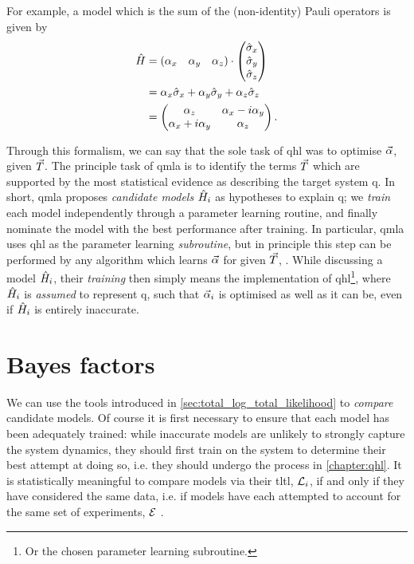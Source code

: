 For example, a model which is the sum of the (non-identity) Pauli operators is given by
\begin{align}
    \label{eqn:pauli_sum_model}
    \begin{split}
        \hat{H} &= \begin{matrix}(\alpha_x & \alpha_y & \alpha_z)\end{matrix} \cdot \left(\begin{matrix}\hat{\sigma}_{x} \\ \hat{\sigma}_{y} \\ \hat{\sigma}_{z}\end{matrix}\right) \\
        &= \alpha_x \hat{\sigma}_{x} + \alpha_y \hat{\sigma}_{y} + \alpha_z \hat{\sigma}_{z} \\
        &= \begin{pmatrix}
            \alpha_z & \alpha_x - i \alpha_y \\
            \alpha_x + i\alpha_y & \alpha_z
        \end{pmatrix}.
    \end{split}
\end{align}
\par 

Through this formalism, we can say that the sole task of \gls{qhl} was to optimise $\vec{\alpha}$, given ${ \vec{T} }$. 
The principle task of \gls{qmla} is to identify the terms ${ \vec{T} }$ 
    which are supported by the most statistical evidence as describing the target system \gls{q}. 
In short, \gls{qmla} proposes \emph{candidate models} $\hat{H}_i$ as hypotheses to explain \gls{q}; 
    we \emph{train} each model independently through a parameter learning routine, 
    and finally nominate the model with the best performance after training. 
In particular, \gls{qmla} uses \gls{qhl} as the parameter learning \emph{subroutine}, 
    but in principle this step can be performed by any algorithm which learns $\vec{\alpha}$ for given ${ \vec{T} }$, 
    \cite{wang2015hamiltonian, krastanov2019stochastic, flurin2020using, niu2019learning, 
    greplova2017quantum,lokhov2018optimal, acampora2019evolutionary, burgarth2017evolution}. 
While discussing a model $\hat{H}_i$, their \emph{training} then simply means the implementation 
    of \gls{qhl}\footnote{Or the chosen parameter learning subroutine.}, 
    where $\hat{H}_i$ is \emph{assumed} to represent \gls{q}, 
    such that $\vec{\alpha}_i$ is optimised as well as it can be, 
    even if $\hat{H}_i$ is entirely inaccurate. 

\section{Bayes factors}\label{sec:bayes_factors}
We can use the tools introduced in \cref{sec:total_log_total_likelihood} to \emph{compare} candidate models. 
Of course it is first necessary to ensure that each model has  
    been adequately trained: while inaccurate models are unlikely to strongly 
    capture the system dynamics, they should first train on the system 
    to determine their best attempt at doing so, 
    i.e. they should undergo the process in \cref{chapter:qhl}.
It is statistically meaningful to compare models via their \gls{tltl}, ${\mathcal{L}}_i$, 
    if and only if they have considered the same data, 
    i.e. if models have each attempted to account for the same set of experiments, ${ \mathcal{E} }$ \cite{kass1995bayes}.
\par 

